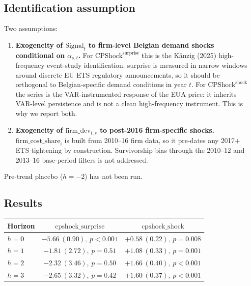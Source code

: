 \documentclass[11pt]{article}
\begin{document}
\subsection{Identification assumption}

Two assumptions:
\begin{enumerate}
  \item \textbf{Exogeneity of $\mathrm{Signal}_t$ to firm-level Belgian demand shocks conditional on $\alpha_{s,t}$.} For $\mathrm{CPShock}^{\mathrm{surprise}}$ this is the Känzig (2025) high-frequency event-study identification: surprise is measured in narrow windows around discrete EU ETS regulatory announcements, so it should be orthogonal to Belgian-specific demand conditions in year $t$. For $\mathrm{CPShock}^{\mathrm{shock}}$ the series is the VAR-instrumented response of the EUA price: it inherits VAR-level persistence and is not a clean high-frequency instrument. This is why we report both.
  \item \textbf{Exogeneity of $\mathrm{firm\_dev}_{i,s}$ to post-2016 firm-specific shocks.} $\mathrm{firm\_cost\_share}_i$ is built from 2010--16 firm data, so it pre-dates any 2017+ ETS tightening by construction. Survivorship bias through the 2010--12 and 2013--16 base-period filters is not addressed.
\end{enumerate}
Pre-trend placebo ($h = -2$) has not been run.

\subsection{Results}

\begin{center}
\begin{tabular}{lcc}
\toprule
Horizon & $\mathrm{cpshock\_surprise}$ & $\mathrm{cpshock\_shock}$ \\
\midrule
$h=0$ & $-5.66\ (0.90),\ p<0.001$ & $+0.58\ (0.22),\ p=0.008$ \\
$h=1$ & $-1.81\ (2.72),\ p=0.51$  & $+1.08\ (0.33),\ p=0.001$ \\
$h=2$ & $-2.32\ (3.46),\ p=0.50$  & $+1.66\ (0.40),\ p<0.001$ \\
$h=3$ & $-2.65\ (3.32),\ p=0.42$  & $+1.60\ (0.37),\ p<0.001$ \\
\bottomrule
\end{tabular}
\end{center}
\end{document}
